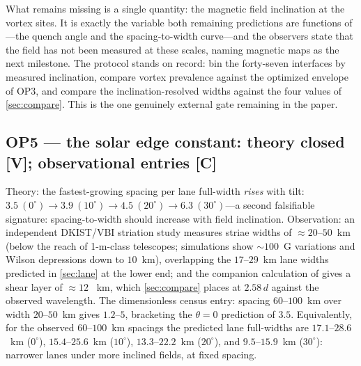 \documentclass[11pt]{article}
\renewcommand{\S}{\mathhexbox278}
\theoremstyle{definition}
\theoremstyle{remark}
\begin{document}
What remains missing is a single quantity: the magnetic field inclination at
the vortex sites. It is exactly the variable both remaining predictions are
functions of---the quench angle and the spacing-to-width curve---and the
observers state that the field has not been measured at these scales, naming
magnetic maps as the next milestone. The protocol stands on record: bin the
forty-seven interfaces by measured inclination, compare vortex prevalence
against the optimized envelope of OP3, and compare the inclination-resolved
widths against the four values of \S\ref{sec:compare}. This is the one
genuinely external gate remaining in the paper.

\subsection*{OP5 --- the solar edge constant: theory closed [V]; observational entries [C]}
Theory: the fastest-growing spacing per lane full-width \emph{rises} with
tilt: $3.5\ (0^\circ) \to 3.9\ (10^\circ) \to 4.5\ (20^\circ) \to 6.3\
(30^\circ)$---a second falsifiable signature: spacing-to-width should
increase with field inclination. Observation: an independent DKIST/VBI
striation study \cite{striae} measures striae widths of $\approx20$--$50$~km
(below the reach of 1-m-class telescopes; simulations show $\sim100$~G
variations and Wilson depressions down to $10$~km), overlapping the
$17$--$29$~km lane widths predicted in \S\ref{sec:lane} at the lower end; and
the companion calculation of \cite{dkist} gives a shear layer of $\approx12$
~km, which \S\ref{sec:compare} places at $2.58\,d$ against the observed
wavelength. The dimensionless census entry: spacing $60$--$100$~km over width
$20$--$50$~km gives $1.2$--$5$, bracketing the $\theta=0$ prediction of
$3.5$. Equivalently, for the observed $60$--$100$~km spacings the predicted
lane full-widths are $17.1$--$28.6$~km ($0^\circ$), $15.4$--$25.6$~km
($10^\circ$), $13.3$--$22.2$~km ($20^\circ$), and $9.5$--$15.9$~km
($30^\circ$): narrower lanes under more inclined fields, at fixed spacing.
\end{document}
